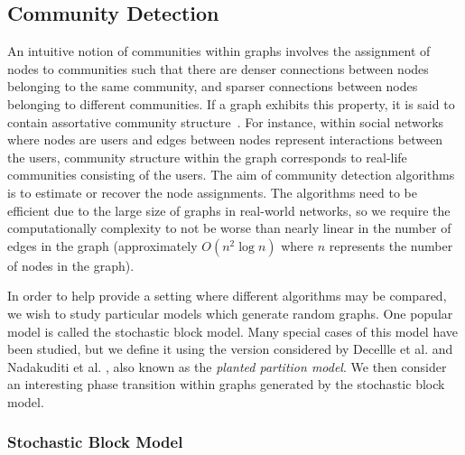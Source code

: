 \documentclass[12pt]{article}
\numberwithin{equation}{section}
\begin{document}
\subsection{Community Detection}
\label{sec:background;subsec:communityDetection}

An intuitive notion of communities within graphs involves the assignment of nodes to communities such that there are denser connections between nodes belonging to the same community, and sparser connections between nodes belonging to different communities. If a graph exhibits this property, it is said to contain assortative community structure~\cite{New06a,DKM+13,For10,New06b}. For instance, within social networks where nodes are users and edges between nodes represent interactions between the users, community structure within the graph corresponds to real-life communities consisting of the users. The aim of community detection algorithms is to estimate or recover the node assignments. The algorithms need to be efficient due to the large size of graphs in real-world networks, so we require the computationally complexity to not be worse than nearly linear in the number of edges in the graph (approximately $O(n^{2}\log n)$ where $n$ represents the number of nodes in the graph).

In order to help provide a setting where different algorithms may be compared, we wish to study particular models which generate random graphs. One popular model is called the stochastic block model. Many special cases of this model have been studied, but we define it using the version considered by Decellle et al. \cite{DKM+13} and Nadakuditi et al. \cite{NN12}, also known as the \textsl{planted partition model}. We then consider an interesting phase transition within graphs generated by the stochastic block model.

\subsubsection{Stochastic Block Model}
\label{sec:background;subsec:communityDetection;subsubsec:stochasticBlockModel}
\end{document}
